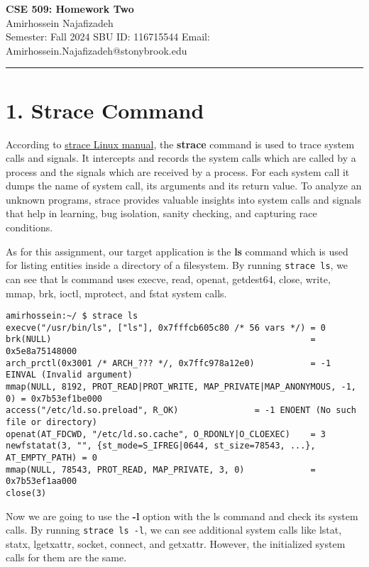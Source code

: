 \documentclass[12pt]{article}
\begin{document}
\begin{center}
    {\LARGE\textbf{CSE 509: Homework Two}} \\[1em]
    {\large Amirhossein Najafizadeh} \\[1em]
    Semester: Fall 2024 \hfill
    SBU ID: 116715544 \hfill
    Email: Amirhossein.Najafizadeh@stonybrook.edu
    \noindent\rule{\textwidth}{0.6pt}
\end{center}

\section{1. Strace Command}

According to \href{https://man7.org/linux/man-pages/man1/strace.1.html}{strace Linux manual}, the \textbf{strace} command is used to trace system calls and signals. It intercepts and records the system calls which are called by a process and the signals which are received by a process. For each system call it dumps the name of system call, its arguments and its return value. To analyze an unknown programs, strace provides valuable insights into system calls and signals that help in learning, bug isolation, sanity checking, and capturing race conditions.

As for this assignment, our target application is the \textbf{ls} command which is used for listing entities inside a directory of a filesystem. By running \texttt{strace ls}, we can see that ls command uses execve, read, openat, getdest64, close, write, mmap, brk, ioctl, mprotect, and fstat system calls.

{\fontsize{8pt}{10pt}\selectfont
\begin{verbatim}
amirhossein:~/ $ strace ls
execve("/usr/bin/ls", ["ls"], 0x7fffcb605c80 /* 56 vars */) = 0
brk(NULL)                                                   = 0x5e8a75148000
arch_prctl(0x3001 /* ARCH_??? */, 0x7ffc978a12e0)           = -1 EINVAL (Invalid argument)
mmap(NULL, 8192, PROT_READ|PROT_WRITE, MAP_PRIVATE|MAP_ANONYMOUS, -1, 0) = 0x7b53ef1be000
access("/etc/ld.so.preload", R_OK)               = -1 ENOENT (No such file or directory)
openat(AT_FDCWD, "/etc/ld.so.cache", O_RDONLY|O_CLOEXEC)    = 3
newfstatat(3, "", {st_mode=S_IFREG|0644, st_size=78543, ...}, AT_EMPTY_PATH) = 0
mmap(NULL, 78543, PROT_READ, MAP_PRIVATE, 3, 0)             = 0x7b53ef1aa000
close(3)
\end{verbatim}
}

Now we are going to use the \textbf{-l} option with the ls command and check its system calls. By running \texttt{strace ls -l}, we can see additional system calls like lstat, statx, lgetxattr, socket, connect, and getxattr. However, the initialized system calls for them are the same.
\end{document}

